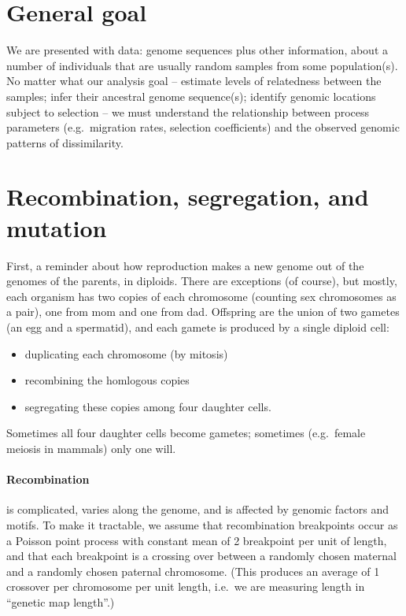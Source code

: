 

\section*{General goal}

We are presented with data: genome sequences plus other information,
about a number of individuals that are usually random samples from some population(s).
No matter what our analysis goal --
estimate levels of relatedness between the samples;
infer their ancestral genome sequence(s);
identify genomic locations subject to selection
-- we must understand the relationship between process parameters
(e.g.\ migration rates, selection coefficients)
and the observed genomic patterns of dissimilarity.



\section{Recombination, segregation, and mutation}

First, a reminder about how reproduction makes a new genome out of the genomes of the parents, in diploids.
There are exceptions (of course), but mostly,
each organism has two copies of each chromosome (counting sex chromosomes as a pair), one from mom and one from dad.
Offspring are the union of two gametes (an egg and a spermatid),
and each gamete is produced by a single diploid cell:
\begin{itemize}
    \item duplicating each chromosome (by mitosis)
    \item recombining the homlogous copies
    \item segregating these copies among four daughter cells.
\end{itemize}
Sometimes all four daughter cells become gametes;
sometimes (e.g.\ female meiosis in mammals) only one will.


\paragraph{Recombination} is complicated, varies along the genome, and is affected by genomic factors and motifs.
To make it tractable, we assume that recombination breakpoints occur as a Poisson point process 
with constant mean of 2 breakpoint per unit of length,
and that each breakpoint is a crossing over between a randomly chosen maternal and a randomly chosen paternal chromosome.
(This produces an average of 1 crossover per chromosome per unit length, 
i.e.\ we are measuring length in ``genetic map length''.)



